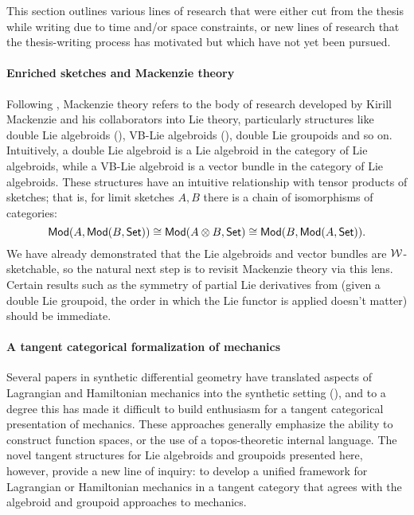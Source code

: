 This section outlines various lines of research that were either cut from the thesis while writing due to time and/or space constraints, or new lines of research that the thesis-writing process has motivated but which have not yet been pursued.

\paragraph{Enriched sketches and Mackenzie theory}

Following \cite{Voronov2012}, Mackenzie theory refers to the body of research developed by Kirill Mackenzie and his collaborators into Lie theory, particularly structures like double Lie algebroids (\cite{Mackenzie1992}), VB-Lie algebroids (\cite{Bursztyn2016}), double Lie groupoids and so on.
Intuitively, a double Lie algebroid is a Lie algebroid in the category of Lie algebroids, while a VB-Lie algebroid is a vector bundle in the category of Lie algebroids.
These structures have an intuitive relationship with tensor products of sketches; that is, for limit sketches $A,B$ there is a chain of isomorphisms of categories:
\[
    \mathsf{Mod}(A, \mathsf{Mod}(B,\mathsf{Set})) \cong \mathsf{Mod}(A \otimes B, \mathsf{Set}) \cong \mathsf{Mod}(B, \mathsf{Mod}(A, \mathsf{Set})).
\]
We have already demonstrated that the Lie algebroids and vector bundles are ${\mathcal{W}}$-sketchable, so the natural next step is to revisit Mackenzie theory via this lens. Certain results such as the symmetry of partial Lie derivatives from \cite{Mackenzie1992} (given a double Lie groupoid, the order in which the Lie functor is applied doesn't matter) should be immediate.

\paragraph{A tangent categorical formalization of mechanics}

Several papers in synthetic differential geometry have translated aspects of Lagrangian and Hamiltonian mechanics into the synthetic setting (\cite{Bunge1984,Nishimura1997a}), and to a degree this has made it difficult to build enthusiasm for a tangent categorical presentation of mechanics. These approaches generally emphasize the ability to construct function spaces, or the use of a topos-theoretic internal language. The novel tangent structures for Lie algebroids and groupoids presented here, however, provide a new line of inquiry: to develop a unified framework for Lagrangian or Hamiltonian mechanics in a tangent category that agrees with the algebroid and groupoid approaches to mechanics.

